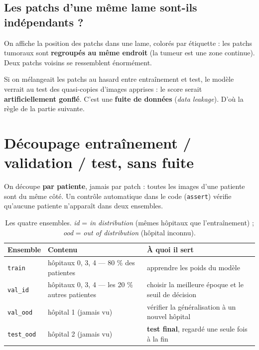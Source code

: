 \documentclass[11pt,a4paper]{article}
\begin{document}
\subsection{Les patchs d'une même lame sont-ils indépendants ?}
On affiche la position des patchs dans une lame, colorés par étiquette : les patchs tumoraux sont
\textbf{regroupés au même endroit} (la tumeur est une zone continue). Deux patchs voisins se ressemblent
énormément.

\begin{attention}
Si on mélangeait les patchs au hasard entre entraînement et test, le modèle verrait au test des quasi-copies
d'images apprises : le score serait \textbf{artificiellement gonflé}. C'est une \textbf{fuite de données}
(\emph{data leakage}). D'où la règle de la partie suivante.
\end{attention}

\section{Découpage entraînement / validation / test, sans fuite}

\begin{resume}[Règle d'or]
On découpe \textbf{par patiente}, jamais par patch : toutes les images d'une patiente sont du même côté.
Un contrôle automatique dans le code (\texttt{assert}) vérifie qu'aucune patiente n'apparaît dans deux ensembles.
\end{resume}

\begin{table}[H]
\centering
\begin{tabularx}{\textwidth}{lXX}
\toprule
\textbf{Ensemble} & \textbf{Contenu} & \textbf{À quoi il sert} \\
\midrule
\texttt{train} & hôpitaux 0, 3, 4 — 80 \% des patientes & apprendre les poids du modèle \\
\texttt{val\_id} & hôpitaux 0, 3, 4 — les 20 \% autres patientes & choisir la meilleure époque et le seuil de décision \\
\texttt{val\_ood} & hôpital 1 (jamais vu) & vérifier la généralisation à un nouvel hôpital \\
\texttt{test\_ood} & hôpital 2 (jamais vu) & \textbf{test final}, regardé une seule fois à la fin \\
\bottomrule
\end{tabularx}
\caption{Les quatre ensembles. \emph{id} = \emph{in distribution} (mêmes hôpitaux que l'entraînement) ;
\emph{ood} = \emph{out of distribution} (hôpital inconnu).}
\end{table}
\end{document}
